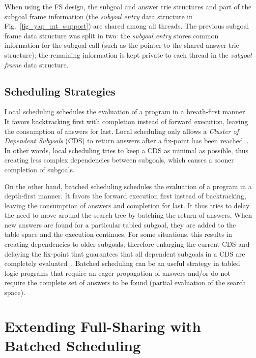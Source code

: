 \documentclass{llncs}
\begin{document}
When using the FS design, the subgoal and answer trie structures and
part of the subgoal frame information (the \emph{subgoal entry} data
structure in Fig.~\ref{fig_yap_mt_support}) are shared among all
threads. The previous subgoal frame data structure was split in two:
the \emph{subgoal entry} stores common information for the subgoal
call (such as the pointer to the shared answer trie structure); the
remaining information is kept private to each thread in the
\emph{subgoal frame} data structure.


\subsection{Scheduling Strategies}

Local scheduling schedules the evaluation of a program in a
breath-first manner. It favors backtracking first with completion
instead of forward execution, leaving the consumption of answers for
last. Local scheduling only allows a \emph{Cluster of Dependent
  Subgoals} (CDS) to return answers after a fix-point has been
reached~\cite{Freire-96}. In other words, local scheduling tries to
keep a CDS as minimal as possible, thus creating less complex
dependencies between subgoals, which causes a sooner completion of
subgoals.

On the other hand, batched scheduling schedules the evaluation of a
program in a depth-first manner. It favors the forward execution first
instead of backtracking, leaving the consumption of answers and
completion for last. It thus tries to delay the need to move around
the search tree by batching the return of answers. When new answers
are found for a particular tabled subgoal, they are added to the table
space and the execution continues. For some situations, this results
in creating dependencies to older subgoals, therefore enlarging the
current CDS and delaying the fix-point that guarantees that all
dependent subgoals in a CDS are completely
evaluated~\cite{Sagonas-98}. Batched scheduling can be an useful
strategy in tabled logic programs that require an eager propagation of
answers and/or do not require the complete set of answers to be found
(partial evaluation of the search space).



\section{Extending Full-Sharing with Batched Scheduling}
\end{document}
